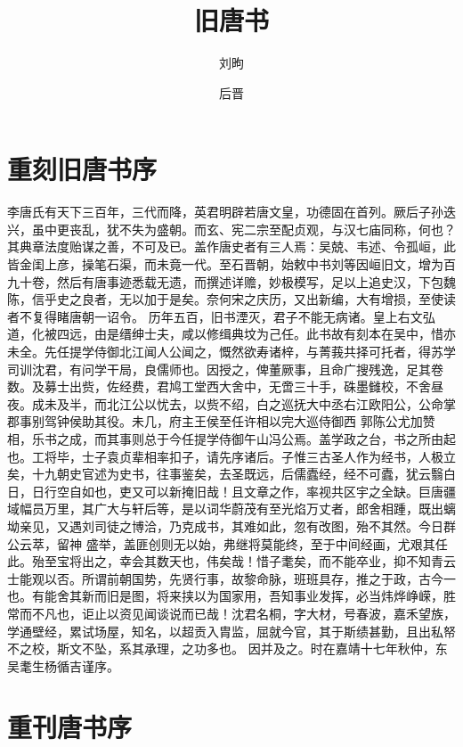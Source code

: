 \documentclass[12pt,UTF8]{ctexbook}
\title{\heiti\zihao{0} 旧唐书}
\author{刘昫}
\date{后晋}
\begin{document}
	
\maketitle
\tableofcontents
	
\frontmatter
\chapter{重刻旧唐书序}
	
	李唐氏有天下三百年，三代而降，英君明辟若唐文皇，功德固在首列。厥后子孙迭兴，虽中更丧乱，犹不失为盛朝。而玄、宪二宗至配贞观，与汉七庙同称，何也？其典章法度贻谋之善，不可及已。盖作唐史者有三人焉：吴兢、韦述、令孤峘，此皆金闺上彦，操笔石渠，而未竟一代。至石晋朝，始敕中书刘等因峘旧文，增为百九十卷，然后有唐事迹悉载无遗，而撰述详赡，妙极模写，足以上追史汉，下包魏陈，信乎史之良者，无以加于是矣。奈何宋之庆历，又出新编，大有增损，至使读者不复得睹唐朝一诏令。
	历年五百，旧书湮灭，君子不能无病诸。皇上右文弘道，化被四远，由是缙绅士夫，咸以修缉典坟为己任。此书故有刻本在吴中，惜亦未全。先任提学侍御北江闻人公闻之，慨然欲寿诸梓，与菁莪共择可托者，得苏学司训沈君，有问学干局，良儒师也。因授之，俾董厥事，且命广搜残逸，足其卷数。及募士出赀，佐经费，君鸠工堂西大舍中，无啻三十手，硃墨雠校，不舍昼夜。成未及半，而北江公以忧去，以赀不绍，白之巡抚大中丞右江欧阳公，公命掌郡事别驾钟侯助其役。未几，府主王侯至任许相以完大巡侍御西
	郭陈公尤加赞相，乐书之成，而其事则总于今任提学侍御午山冯公焉。盖学政之台，书之所由起也。工将毕，士子袁贞辈相率扣子，请先序诸后。子惟三古圣人作为经书，人极立矣，十九朝史官述为史书，往事鉴矣，去圣既远，后儒蠹经，经不可蠹，犹云翳白日，日行空自如也，吏又可以新掩旧哉！且文章之作，率视共区宇之全缺。巨唐疆域幅员万里，其广大与轩后等，是以词华蔚茂有至光焰万丈者，郎舍相踵，既出螭坳亲见，又遇刘司徒之博洽，乃克成书，其难如此，忽有改图，殆不其然。今日群公云萃，留神
	盛举，盖匪创则无以始，弗继将莫能终，至于中间经画，尤艰其任此。殆至宝将出之，幸会其数天也，伟矣哉！惜子耄矣，而不能卒业，抑不知青云士能观以否。所谓前朝国势，先贤行事，故黎命脉，班班具存，推之于政，古今一也。有能舍其新而旧是图，将来挟以为国家用，吾知事业发挥，必当炜烨峥嵘，胜常而不凡也，讵止以资见闻谈说而已哉！沈君名桐，字大材，号春波，嘉禾望族，学通壁经，累试场屋，知名，以超贡入胄监，屈就今官，其于斯绩甚勤，且出私帑不之校，斯文不坠，系其承理，之功多也。
	因并及之。时在嘉靖十七年秋仲，东吴耄生杨循吉谨序。
	
\chapter{重刊唐书序}
	
\end{document}
